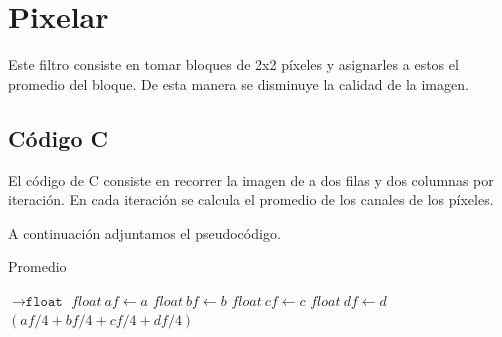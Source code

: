 \section{Pixelar}
\par{Este filtro consiste en tomar bloques de 2x2 píxeles y asignarles a estos el promedio del bloque. De esta manera se disminuye la calidad de la imagen.}
\subsection{Código C}
\par{El código de C consiste en recorrer la imagen de a dos filas y dos columnas por iteración. En cada iteración se calcula el promedio de los canales de los píxeles.}
\par{A continuación adjuntamos el pseudocódigo.}

\begin{algorithm}[h!]
\caption{Promedio}
\begin{algorithmic}
    $\to \texttt{float}$
	\State $float~ af \gets a$
	\State $float~ bf \gets b$
	\State $float~ cf \gets c$
	\State $float~ df \gets d$
	\State \Return $(af/4+bf/4+cf/4+df/4)$
	
\EndFunction
\end{algorithmic} 
\end{algorithm}	
	
